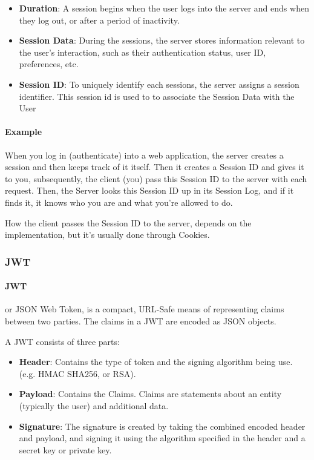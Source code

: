 \documentclass[a4paper]{article}
\begin{document}
    \begin{itemize}
        \item \textbf{Duration}: A session begins when the user logs into the server and ends when they log out, or after a period of inactivity. 
        \item \textbf{Session Data}: During the sessions, the server stores information relevant to the user's interaction, such as their authentication status, user ID, preferences, etc.
        \item \textbf{Session ID}: To uniquely identify each sessions, the server assigns a session identifier. This session id is used to to associate the Session Data with the User
    \end{itemize}

    \paragraph*{Example} When you log in (authenticate) into a web application, the server creates a session and then keeps track of it itself. Then it creates a Session ID and gives it to you, subsequently, the client (you) pass this Session ID to the server with each request. Then, the Server looks this Session ID up in its Session Log, and if it finds it, it knows who you are and what you're allowed to do.

    How the client passes the Session ID to the server, depends on the implementation, but it's usually done through Cookies.


    \subsubsection{JWT}

    \paragraph*{JWT} or JSON Web Token, is a compact, URL-Safe means of representing claims between two parties. The claims in a JWT are encoded as JSON objects.

    A JWT consists of three parts:

    \begin{itemize}
        \item \textbf{Header}: Contains the type of token and the signing algorithm being use. (e.g. HMAC SHA256, or RSA).
        \item \textbf{Payload}: Contains the Claims. Claims are statements about an entity (typically the user) and additional data.
        \item \textbf{Signature}: The signature is created by taking the combined encoded header and payload, and signing it using the algorithm specified in the header and a secret key or private key.
    \end{itemize}
\end{document}

